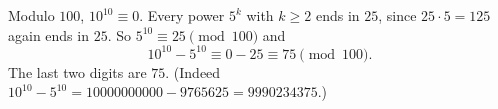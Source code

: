 Modulo $100$, $10^{10}\equiv0$. Every power $5^k$ with $k\ge2$ ends in $25$, since $25\cdot5=125$ again ends in $25$. So $5^{10}\equiv25\pmod{100}$ and
\[10^{10}-5^{10}\equiv0-25\equiv75\pmod{100}.\]
The last two digits are $\boxed{75}$. (Indeed $10^{10}-5^{10}=10000000000-9765625=9990234375$.)
